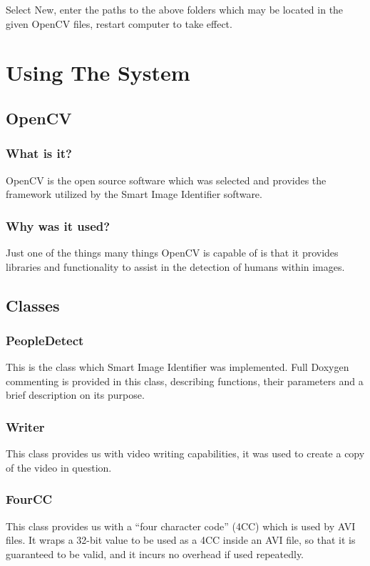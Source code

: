 \documentclass[a4paper,12pt]{report}
\begin{document}
\begin{itemize}
		\linebreak
		Select New, enter the paths to the above folders which may be located in the given
		OpenCV files, restart computer to take effect.
	\end{itemize}
	
	\section{Using The System}
	\subsection{OpenCV}
	\subsubsection{What is it?}
	OpenCV is the open source software which was selected and provides the framework
	utilized by the Smart Image Identifier software.
	\subsubsection{Why was it used?}
	Just one of the things many things OpenCV is capable of is that it provides libraries and
	functionality to assist in the detection of humans within images.

	\subsection{Classes}
	\subsubsection{PeopleDetect}
	This is the class which Smart Image Identifier was implemented.
	Full Doxygen commenting is provided in this class, describing functions, their parameters
	and a brief description on its purpose.
	\subsubsection{Writer}
This class provides us with video writing capabilities, it was used to create a copy of the
video in question.
\subsubsection{FourCC}
This class provides us with a “four character code” (4CC) which is used by AVI files.
It wraps a 32-bit value to be used as a 4CC inside an AVI file, so that it is guaranteed to be
valid, and it incurs no overhead if used repeatedly.
\end{document}
